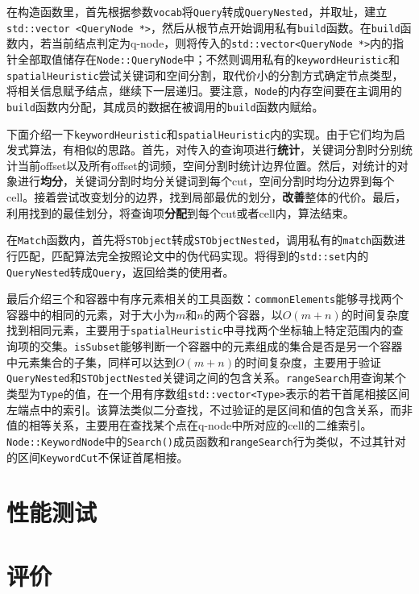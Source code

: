 \documentclass[UTF8]{ctexart}
\begin{document}
在构造函数里，首先根据参数\texttt{vocab}将\texttt{Query}转成\texttt{QueryNested}，并取址，建立\texttt{std::vector <QueryNode *>}，然后从根节点开始调用私有\texttt{build}函数。在\texttt{build}函数内，若当前结点判定为q-node，则将传入的\texttt{std::vector<QueryNode *>}内的指针全部取值储存在\texttt{Node::QueryNode}中；不然则调用私有的\texttt{keywordHeuristic}和\texttt{spatialHeuristic}尝试关键词和空间分割，取代价小的分割方式确定节点类型，将相关信息赋予结点，继续下一层递归。要注意，\texttt{Node}的内存空间要在主调用的\texttt{build}函数内分配，其成员的数据在被调用的\texttt{build}函数内赋给。

下面介绍一下\texttt{keywordHeuristic}和\texttt{spatialHeuristic}内的实现。由于它们均为启发式算法，有相似的思路。首先，对传入的查询项进行\textbf{统计}，关键词分割时分别统计当前offset以及所有offset的词频，空间分割时统计边界位置。然后，对统计的对象进行\textbf{均分}，关键词分割时均分关键词到每个cut，空间分割时均分边界到每个cell。接着尝试改变划分的边界，找到局部最优的划分，\textbf{改善}整体的代价。最后，利用找到的最佳划分，将查询项\textbf{分配}到每个cut或者cell内，算法结束。

在\texttt{Match}函数内，首先将\texttt{STObject}转成\texttt{STObjectNested}，调用私有的\texttt{match}函数进行匹配，匹配算法完全按照论文中的伪代码实现。将得到的\texttt{std::set}内的\texttt{QueryNested}转成\texttt{Query}，返回给类的使用者。

最后介绍三个和容器中有序元素相关的工具函数：\texttt{commonElements}能够寻找两个容器中的相同的元素，对于大小为$m$和$n$的两个容器，以$O(m+n)$的时间复杂度找到相同元素，主要用于\texttt{spatialHeuristic}中寻找两个坐标轴上特定范围内的查询项的交集。\texttt{isSubset}能够判断一个容器中的元素组成的集合是否是另一个容器中元素集合的子集，同样可以达到$O(m+n)$的时间复杂度，主要用于验证\texttt{QueryNested}和\texttt{STObjectNested}关键词之间的包含关系。\texttt{rangeSearch}用查询某个类型为\texttt{Type}的值，在一个用有序数组\texttt{std::vector<Type>}表示的若干首尾相接区间左端点中的索引。该算法类似二分查找，不过验证的是区间和值的包含关系，而非值的相等关系，主要用在查找某个点在q-node中所对应的cell的二维索引。\texttt{Node::KeywordNode}中的\texttt{Search()}成员函数和\texttt{rangeSearch}行为类似，不过其针对的区间\texttt{KeywordCut}不保证首尾相接。

\section{性能测试}

\section{评价}
\end{document}
